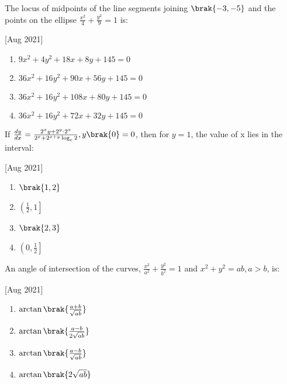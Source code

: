     \item The locus of midpoints of the line segments joining $\brak{-3,-5}$ and the points on the ellipse $\frac{x^2}{4}+\frac{y^2}{9}=1$ is:
    
    \hfill[Aug 2021]

        \begin{multicols}{2}
            \begin{enumerate}
                \item $9x^2+4y^2+18x+8y+145=0$
                \item $36x^2+16y^2+90x+56y+145=0$
                \item $36x^2+16y^2+108x+80y+145=0$
                \item $36x^2+16y^2+72x+32y+145=0$
            \end{enumerate}
        \end{multicols}

    \item If $\frac{dy}{dx}=\frac{2^xy+2^y\cdot 2^x}{2^x+2^{x+y}\log_e2}, y\brak{0}=0$, then for $y=1$, the value of x lies in the interval:
    
    \hfill[Aug 2021]

        \begin{multicols}{4}
            \begin{enumerate}
                \item $\brak{1,2}$
                \item $\left( \frac{1}{2},1\right]$
                \item  $\brak{2,3}$
                \item $\left( 0,\frac{1}{2}\right]$
            \end{enumerate}
        \end{multicols}
        
    \item An angle of intersection of the curves, $\frac{x^2}{a^2}+\frac{y^2}{b^2}=1$ and $x^2+y^2=ab,a>b$, is:
    
    \hfill[Aug 2021]

        \begin{multicols}{4}
            \begin{enumerate}
                \item $\arctan\brak{\frac{a+b}{\sqrt{ab}}}$
                \item $\arctan\brak{\frac{a-b}{2\sqrt{ab}}}$
                \item $\arctan\brak{\frac{a-b}{\sqrt{ab}}}$
                \item $\arctan\brak{2\sqrt{ab}}$
            \end{enumerate}
        \end{multicols}

